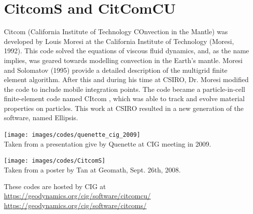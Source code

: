 
\section{CitcomS and CitComCU} 

Citcom (California Institute of Technology COnvection in the Mantle) was  
developed by Louis Moresi at the California Institute of Technology (Moresi, 1992). 
This code solved the equations of viscous fluid dynamics, and, as the name implies, 
was geared towards modelling convection in the Earth's mantle. Moresi and 
Solomatov (1995) provide a detailed description of the multigrid
finite element algorithm. After this and during his time at CSIRO, Dr. Moresi 
modified the code to include mobile integration points. The code became a 
particle-in-cell finite-element code named CItcom , which was able to track 
and evolve material properties on particles. This work at
CSIRO resulted in a new generation of the software, named Ellipsis.

\begin{center}
\texttt{[image: images/codes/quenette\_cig\_2009]}\\
{\captionfont Taken from a presentation give by Quenette at CIG meeting in 2009.}
\end{center}

\begin{center}
\texttt{[image: images/codes/CitcomS]}\\
{\captionfont Taken from a poster by Tan \etal at Geomath, Sept. 26th, 2008.}
\end{center}

These codes are hosted by CIG at\\
\url{https://geodynamics.org/cig/software/citcomcu/}  \\
\url{https://geodynamics.org/cig/software/citcoms/}


